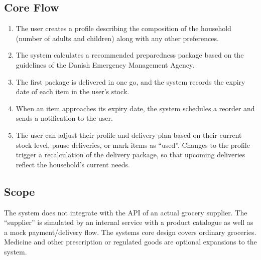 \documentclass[11pt,a4paper]{article}
\begin{document}
\subsection*{Core Flow}
\begin{enumerate}[nosep]
  \item The user creates a profile describing the composition of the household (number of adults and children) along with any other preferences.
  \item The system calculates a recommended preparedness package based on the guidelines of the Danish Emergency Management Agency.
  \item The first package is delivered in one go, and the system records the expiry date of each item in the user's stock.
  \item When an item approaches its expiry date, the system schedules a reorder and sends a notification to the user.
  \item The user can adjust their profile and delivery plan based on their current stock level, pause deliveries, or mark items as ``used''.  Changes to the profile trigger a recalculation of the delivery package, so that upcoming deliveries reflect the household's current needs.
\end{enumerate}
\subsection*{Scope}
The system does not integrate with the API of an actual grocery supplier. The
``supplier'' is simulated by an internal service with a product catalogue as well as a mock
payment/delivery flow.
The systems core design covers ordinary groceries. Medicine and other prescription or regulated goods are optional expansions to the system.
\end{document}
